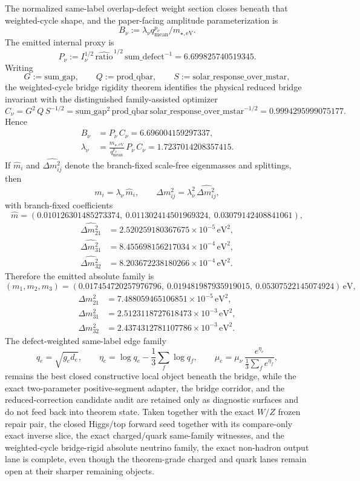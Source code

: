\documentclass[11pt]{article}
\begin{document}
The normalized same-label overlap-defect weight section closes beneath that weighted-cycle shape, and the paper-facing amplitude parameterization is
\[
B_\nu:=\lambda_\nu q_{\mathrm{mean}}^{p_\nu}/m_{\star,\mathrm{eV}}.
\]
The emitted internal proxy is
\[
P_\nu:=I_\nu^{1/2}\,\widehat{\mathrm{ratio}}^{\,1/2}\,\mathrm{sum\_defect}^{-1}=6.699825740519345.
\]
Writing
\[
G:=\mathrm{sum\_gap},
\qquad
Q:=\mathrm{prod\_qbar},
\qquad
S:=\mathrm{solar\_response\_over\_mstar},
\]
the weighted-cycle bridge rigidity theorem identifies the physical reduced bridge invariant with the distinguished family-assisted optimizer
\[
C_\nu
=
G^2\,Q\,S^{-1/2}
=
\mathrm{sum\_gap}^2\,\mathrm{prod\_qbar}\,\mathrm{solar\_response\_over\_mstar}^{-1/2}
=
0.9994295999075177.
\]
Hence
\[
\begin{aligned}
B_\nu&=P_\nu\,C_\nu=6.696004159297337,\\
\lambda_\nu&=\frac{m_{\star,\mathrm{eV}}}{q_{\mathrm{mean}}^{p_\nu}}\,P_\nu\,C_\nu=1.7237014208357415.
\end{aligned}
\]
If \(\hat m_i\) and \(\widehat{\Delta m_{ij}^2}\) denote the branch-fixed scale-free eigenmasses and splittings, then
\[
m_i=\lambda_\nu\,\hat m_i,
\qquad
\Delta m_{ij}^2=\lambda_\nu^2\,\widehat{\Delta m_{ij}^2},
\]
with branch-fixed coefficients
\[
\hat m
=
(0.010126301485273374,\ 0.011302414501969324,\ 0.03079142408841061),
\]
\[
\begin{aligned}
\widehat{\Delta m_{21}^2}&=2.520259180367675\times 10^{-5}\,\mathrm{eV}^2,\\
\widehat{\Delta m_{31}^2}&=8.455698156217034\times 10^{-4}\,\mathrm{eV}^2,\\
\widehat{\Delta m_{32}^2}&=8.203672238180266\times 10^{-4}\,\mathrm{eV}^2.
\end{aligned}
\]
Therefore the emitted absolute family is
\[
(m_1,m_2,m_3)
=
(0.017454720257976796,\ 0.019481987935919015,\ 0.05307522145074924)\,\mathrm{eV},
\]
\[
\begin{aligned}
\Delta m_{21}^2&=7.488059465106851\times10^{-5}\,\mathrm{eV}^2,\\
\Delta m_{31}^2&=2.5123118727618473\times10^{-3}\,\mathrm{eV}^2,\\
\Delta m_{32}^2&=2.4374312781107786\times10^{-3}\,\mathrm{eV}^2.
\end{aligned}
\]
The defect-weighted same-label edge family
\[
q_e=\sqrt{g_e d_e},
\qquad
\eta_e=\log q_e-\frac13\sum_f \log q_f,
\qquad
\mu_e=\mu_\nu\,\frac{e^{\eta_e}}{\frac13\sum_f e^{\eta_f}},
\]
remains the best closed constructive local object beneath the bridge, while the exact two-parameter positive-segment adapter, the bridge corridor, and the reduced-correction candidate audit are retained only as diagnostic surfaces and do not feed back into theorem state.
Taken together with the exact \(W/Z\) frozen repair pair, the closed Higgs/top forward seed together with its compare-only exact inverse slice, the exact charged/quark same-family witnesses, and the weighted-cycle bridge-rigid absolute neutrino family, the exact non-hadron output lane is complete, even though the theorem-grade charged and quark lanes remain open at their sharper remaining objects.
\end{document}

